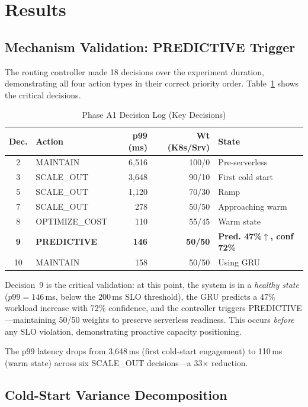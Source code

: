 \documentclass[conference,letterpaper]{IEEEtran}
\begin{document}
\section{Results}

\subsection{Mechanism Validation: PREDICTIVE Trigger}

The routing controller made 18 decisions over the experiment duration, demonstrating all four action types in their correct priority order. Table~\ref{tab:decision_log} shows the critical decisions.

\begin{table}[htbp]
\caption{Phase A1 Decision Log (Key Decisions)}
\label{tab:decision_log}
\centering
\small
\begin{tabular}{clrrl}
\toprule
\textbf{Dec.} & \textbf{Action} & \textbf{p99 (ms)} & \textbf{Wt (K8s/Srv)} & \textbf{State} \\
\midrule
2 & MAINTAIN & 6{,}516 & 100/0 & Pre-serverless \\
3 & SCALE\_OUT & 3{,}648 & 90/10 & First cold start \\
5 & SCALE\_OUT & 1{,}120 & 70/30 & Ramp \\
7 & SCALE\_OUT & 278 & 50/50 & Approaching warm \\
8 & OPTIMIZE\_COST & 110 & 55/45 & Warm state \\
\textbf{9} & \textbf{PREDICTIVE} & \textbf{146} & \textbf{50/50} & \textbf{Pred. 47\%$\uparrow$, conf 72\%} \\
10 & MAINTAIN & 158 & 50/50 & Using GRU \\
\bottomrule
\end{tabular}
\end{table}

Decision~9 is the critical validation: at this point, the system is in a \textit{healthy state} ($p99 = 146$\,ms, below the 200\,ms SLO threshold), the GRU predicts a 47\% workload increase with 72\% confidence, and the controller triggers PREDICTIVE---maintaining 50/50 weights to preserve serverless readiness. This occurs \textit{before} any SLO violation, demonstrating proactive capacity positioning.

The p99 latency drops from 3{,}648\,ms (first cold-start engagement) to 110\,ms (warm state) across six SCALE\_OUT decisions---a 33$\times$ reduction.

\subsection{Cold-Start Variance Decomposition}
\end{document}
